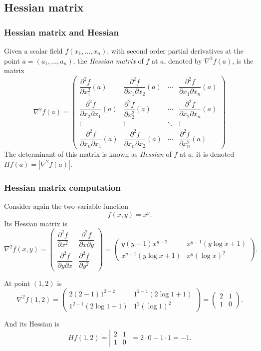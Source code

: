 \subsection{Hessian matrix}
\begin{frame}
\frametitle{Hessian matrix and Hessian}
\begin{definition}
Given a scalar field $f(x_1,\ldots,x_n)$, with second order partial derivatives at the point $a=(a_1,\ldots,a_n)$, the \emph{Hessian matrix} of $f$ at $a$, denoted by $\nabla^2f(a)$, is the matrix
\[
\nabla^2f(a)=\left(
\begin{array}{cccc}
\dfrac{\partial^2 f}{\partial x_1^2}(a) &
\dfrac{\partial^2 f}{\partial x_1 \partial x_2}(a) &
\cdots &
\dfrac{\partial^2 f}{\partial x_1 \partial x_n}(a)\\
\dfrac{\partial^2 f}{\partial x_2 \partial x_1}(a) &
\dfrac{\partial^2 f}{\partial x_2^2}(a) &
\cdots &
\dfrac{\partial^2 f}{\partial x_2 \partial x_n}(a)\\
\vdots & \vdots & \ddots & \vdots \\
\dfrac{\partial^2 f}{\partial x_n \partial x_1}(a) &
\dfrac{\partial^2 f}{\partial x_n \partial x_2}(a) &
\cdots &
\dfrac{\partial^2 f}{\partial x_n^2}(a)
\end{array}
\right)
\]
The determinant of this matrix is known as \emph{Hessian} of $f$ at $a$; it is denoted $Hf(a)=|\nabla^2f(a)|$.
\end{definition}
\end{frame}


\begin{frame}
\frametitle{Hessian matrix computation}
Consider again the two-variable function
\[f(x,y)=x^y.\]
Its Hessian matrix is
\[
\nabla^2f(x,y)=\left(
\begin{array}{cc}
\dfrac{\partial^2 f}{\partial x^2} & \dfrac{\partial^2 f}{\partial x \partial y}\\
\dfrac{\partial^2 f}{\partial y \partial x} & \dfrac{\partial^2 f}{\partial y^2}
\end{array}
\right)
=
\left(
\begin{array}{cc}
y(y-1)x^{y-2} & x^{y-1}(y\log x+1) \\
x^{y-1}(y\log x+1) & x^y(\log x)^2
\end{array}
\right).
\]

At point $(1,2)$ is
\[
\nabla^2f(1,2)=\left(
\begin{array}{cc}
2(2-1)1^{2-2} & 1^{2-1}(2\log 1+1) \\
1^{2-1}(2\log 1+1) & 1^2(\log 1)^2
\end{array}
\right)
=
\left(
\begin{array}{cc}
2 & 1 \\
1 & 0
\end{array}
\right).
\]

And its Hessian is
\[
Hf(1,2)=\left|
\begin{array}{cc}
2 & 1 \\
1 & 0
\end{array}
\right|=
2\cdot 0-1\cdot1= -1.
\]
\end{frame}


